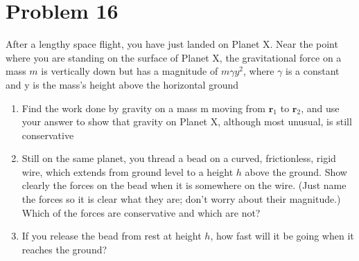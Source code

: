 \documentclass{article}
\begin{document}
\section*{Problem 16} 
After a lengthy space flight, you have just landed on Planet X. Near the point where you are standing on the surface of Planet X, the gravitational force on a mass $m$ is vertically down but has a magnitude of $m\gamma y^2$, where $\gamma$ is a constant and y is the mass's height above the horizontal ground
\begin{enumerate}[label=\alph*)]
	\item %
	Find the work done by gravity on a mass m moving from $\textbf{r}_1$ to $\textbf{r}_2$, and use your answer to show that gravity on Planet X, although most unusual, is still conservative
	\item %
	Still on the same planet, you thread a bead on a curved, frictionless, rigid wire, which extends from ground level to a height $h$ above the ground. Show clearly the forces on the bead when it is somewhere on the wire. (Just name the forces so it is clear what they are; don't worry about their magnitude.) Which of the forces are conservative and which are not?
	\item %
	If you release the bead from rest at height $h$, how fast will it be going when it reaches the ground?
\end{enumerate}
\end{document}
